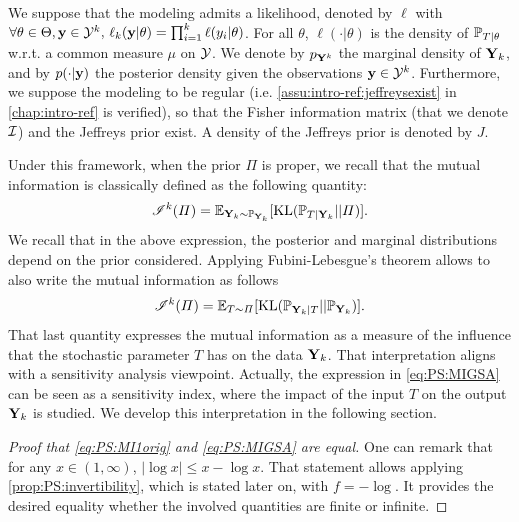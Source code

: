 We suppose that the modeling admits a likelihood, denoted by $\ell$ with $\forall\theta\in\Theta,\mathbf{y}\in\mathcal{Y}^k,\, \ell_k(\mathbf{y}|\theta)=\prod_{i=1}^k\ell(y_i|\theta) $. For all $\theta$, $\ell(\cdot|\theta)$ is the density of $\mathbb{P}_{T|\theta}$ w.r.t. a common measure $\mu$ on $\mathcal{Y}$. We denote by $p_{\mathbf{Y}^k}$ the marginal density of $\mathbf{Y}_k$, and by $p(\cdot|\mathbf{y})$ the posterior density given the observations $\mathbf{y}\in\mathcal{Y}^k$. %
Furthermore, we suppose the modeling to be regular (i.e. \cref{assu:intro-ref:jeffreysexist} in \cref{chap:intro-ref} is verified), so that the Fisher information matrix (that we denote $\mathcal{I}$) and the Jeffreys prior exist. A density of the Jeffreys prior is denoted by $J$.



Under this framework, when the prior $\varPi$ is proper, %
we recall that the mutual information is classically defined as the following quantity:
    \begin{equation}\label{eq:PS:MI1orig}
        \mathscr{I}^k(\varPi) =  \mathbb{E}_{\mathbf{Y}_k\sim \mathbb{P}_{\mathbf{Y}_k}}[\text{KL}(\mathbb{P}_{T|\mathbf{Y}_k}||\varPi)] .
    \end{equation}
We recall that in the above expression, the posterior and marginal distributions depend on the prior considered. %
Applying Fubini-Lebesgue's theorem allows to also write the mutual information as follows
    \begin{equation}\label{eq:PS:MIGSA}
        \mathscr{I}^k(\varPi) = \mathbb{E}_{T\sim\varPi}[\text{KL}(\mathbb{P}_{\mathbf{Y}_k|T}||\mathbb{P}_{\mathbf{Y}_k}) ].
    \end{equation}
That last quantity expresses the mutual information as 
a measure of the influence that the stochastic parameter $T$ has on the data $\mathbf{Y}_k$.
That interpretation aligns with a sensitivity analysis viewpoint. Actually, the expression in \cref{eq:PS:MIGSA} can be seen as a sensitivity index, where the impact of the input $T$ on the output $\mathbf{Y}_k$ is studied. We develop this interpretation in the following section.


\begin{proof}[Proof that \cref{eq:PS:MI1orig} and \cref{eq:PS:MIGSA} are  equal]
    One can remark that for any $x\in(1,\infty)$, $|\log x|\leq x-\log x$. That statement allows applying \cref{prop:PS:invertibility}, which is stated later on, with $f=-\log$. It provides the desired equality whether the involved quantities are finite or infinite.
\end{proof}



